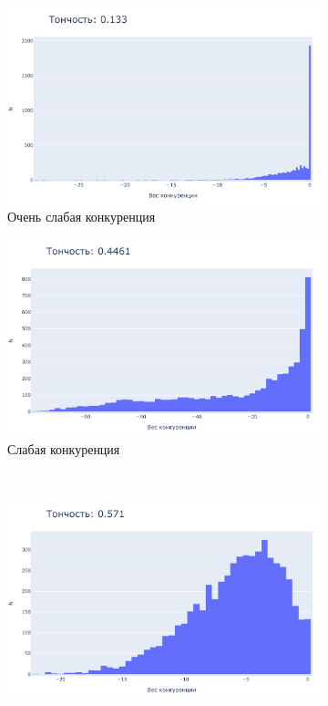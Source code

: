 \documentclass[a4paper]{article}
\begin{document}
\begin{figure}
\centering
\begin{subfigure}{0.2\textwidth}
    \includegraphics[width=\textwidth,keepaspectratio=true]{competition_distribution_worst_ru.pdf}
    \caption{Очень слабая конкуренция}
\end{subfigure}
\begin{subfigure}{0.2\textwidth}
    \includegraphics[width=\textwidth,keepaspectratio=true]{competition_distribution_medium_bad_ru.pdf}
    \caption{Слабая конкуренция}
\end{subfigure}
\\
\begin{subfigure}{0.2\textwidth}
    \includegraphics[width=\textwidth,keepaspectratio=true]{competition_distribution_medium_good_ru.pdf}

\end{subfigure}
\end{figure}
\end{document}
